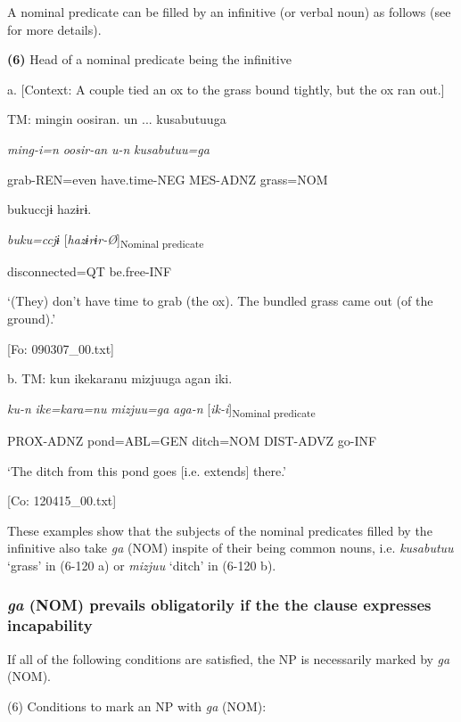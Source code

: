 A nominal predicate can be filled by an infinitive (or verbal noun) as follows (see  for more details).

\textbf{(6)}  Head of a nominal predicate being the infinitive

  a.  [Context: A couple tied an ox to the grass bound tightly, but the ox ran out.]

    TM:  mingin  oosiran.  un ...  kusabutuuga

      \textit{ming-i=n}  \textit{oosir-an}  \textit{u-n}  \textit{kusabutuu=ga}

      grab-REN=even  have.time-NEG  MES-ADNZ  grass=NOM

      bukuccjɨ  hazɨrɨ.

      \textit{buku=ccjɨ}  [\textit{hazɨrɨr-Ø}]\textsubscript{Nominal predicate}

      disconnected=QT  be.free-INF

      ‘(They) don’t have time to grab (the ox). The bundled grass came out (of the ground).’

      [Fo: 090307\_00.txt]

  b.  TM:  kun  {\textbar}ike{\textbar}karanu  mizjuuga  agan  iki.

      \textit{ku-n}  \textit{ike=kara=nu}  \textit{mizjuu=ga}  \textit{aga-n}  [\textit{ik-i}]\textsubscript{Nominal predicate}

      PROX-ADNZ  pond=ABL=GEN  ditch=NOM  DIST-ADVZ  go{}-INF

      ‘The ditch from this pond goes [i.e. extends] there.’

      [Co: 120415\_00.txt]

These examples show that the subjects of the nominal predicates filled by the infinitive also take \textit{ga} (NOM) inspite of their being common nouns, i.e. \textit{kusabutuu} ‘grass’ in (6-120 a) or \textit{mizjuu} ‘ditch’ in (6-120 b).

\subsubsection{\textit{ga} (NOM) prevails obligatorily if the the clause expresses incapability}

If all of the following conditions are satisfied, the NP is necessarily marked by \textit{ga} (NOM).

\begin{styleBeschriftung}
\textmd{(6) Conditions to mark an NP with} \textmd{\textit{ga}}\textmd{ (NOM):}
\end{styleBeschriftung}

